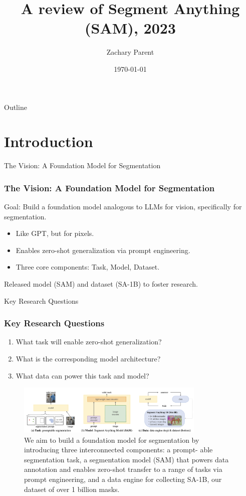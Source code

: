 \documentclass{beamer}
\title{A review of \textbf{Segment Anything (SAM)}, 2023}
\author{Zachary Parent}
\date{\today}
\institute{MAI}
\begin{document}
\begin{frame}
    \titlepage
\end{frame}

\begin{frame}{Outline}
    \tableofcontents
\end{frame}

\section{Introduction}

\begin{frame}{The Vision: A Foundation Model for Segmentation}
    \frametitle{The Vision: A Foundation Model for Segmentation}
    Goal: Build a foundation model analogous to LLMs for vision, specifically for segmentation.
    \begin{itemize}
        \item Like GPT, but for pixels.
        \item Enables zero-shot generalization via prompt engineering.
        \item Three core components: Task, Model, Dataset.
    \end{itemize}
    Released model (SAM) and dataset (SA-1B) to foster research.
\end{frame}

\begin{frame}{Key Research Questions}
    \frametitle{Key Research Questions}
    \begin{enumerate}
        \item What task will enable zero-shot generalization?
        \item What is the corresponding model architecture?
        \item What data can power this task and model?
    \end{enumerate}
    \begin{figure}
        \centering
        \includegraphics[width=0.8\textwidth]{figures/SA_overview.png}
        \caption{\tiny We aim to build a foundation model for segmentation by introducing three interconnected components: a prompt-
        able segmentation task, a segmentation model (SAM) that powers data annotation and enables zero-shot transfer to a range
        of tasks via prompt engineering, and a data engine for collecting SA-1B, our dataset of over 1 billion masks.}
    \end{figure}
\end{frame}
\end{document}
